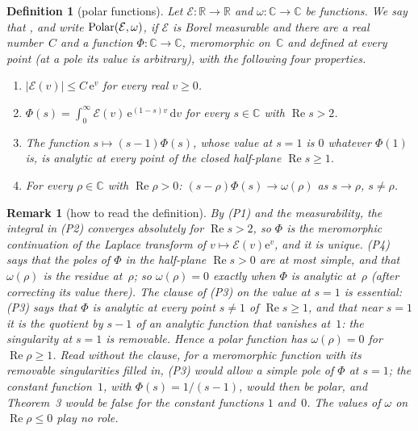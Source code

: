 \documentclass[11pt,a4paper]{article}
\makeatletter
\newcommand{\lean}[1]{\csname LN@#1\endcsname}
\newcommand{\leantag}{{\sffamily\bfseries\fontsize{6.3}{8}\selectfont\color{leancol}\addfontfeatures{LetterSpace=7}LEAN}}
\newcommand{\leanline}[1]{\par\nopagebreak\vspace{-2.5pt}{\fontsize{8.9}{12.4}\selectfont\color{inksoft}\raggedright
  \noindent\llap{\leantag\hspace{9pt}}#1\par}\vspace{1pt}}
\theoremstyle{plainx}
\theoremstyle{uprightx}
\newtheorem{definition}[theorem]{Definition}
\newtheorem{remark}[theorem]{Remark}
\newcommand{\C}{\mathbb{C}}
\newcommand{\RR}{\mathbb{R}}
\newcommand{\ee}{\mathrm{e}}
\newcommand{\dd}{\mathrm{d}}
\newcommand{\re}{\operatorname{Re}}
\newcommand{\cE}{\mathcal{E}}
\makeatother
\begin{document}
\begin{definition}[polar functions]\label{d:polar}
Let $\cE\colon\RR\to\RR$ and $\omega\colon\C\to\C$ be functions. We say that \polarWords{\cE}{\omega}, and write
$\isPolar{\cE}{\omega}$, if $\cE$ is Borel measurable and there are a real number~$C$ and a function
$\Phi\colon\C\to\C$, meromorphic on~$\C$ and defined at every point (at a pole its value is arbitrary), with the
following four properties.
\begin{enumerate}[label=(P\arabic*)]
\item $|\cE(v)|\le C\,\ee^{v}$ for every real $v\ge 0$.
\item $\Phi(s)=\int_0^\infty\cE(v)\,\ee^{(1-s)v}\,\dd v$ for every $s\in\C$ with $\re s>2$.
\item The function $s\mapsto(s-1)\Phi(s)$, whose value at $s=1$ is $0$ whatever $\Phi(1)$ is, is analytic at every
point of the closed half-plane $\re s\ge 1$.
\item For every $\rho\in\C$ with $\re\rho>0$: $(s-\rho)\Phi(s)\to\omega(\rho)$ as $s\to\rho$, $s\ne\rho$.
\end{enumerate}
\end{definition}
\leanline{\lean{IsPolar}}

\begin{remark}[how to read the definition]\label{r:polar}
By (P1) and the measurability, the integral in (P2) converges absolutely for $\re s>2$, so $\Phi$ is the meromorphic
continuation of the Laplace transform of $v\mapsto\cE(v)\ee^{v}$, and it is unique. (P4) says that the poles of $\Phi$
in the half-plane $\re s>0$ are at most simple, and that $\omega(\rho)$ is the residue at~$\rho$; so
$\omega(\rho)=0$ exactly when $\Phi$ is analytic at~$\rho$ (after correcting its value there). The clause of (P3)
on the value at $s=1$ is essential: (P3) says that $\Phi$ is analytic at
every point $s\ne 1$ of $\re s\ge1$, and that near $s=1$ it is the quotient by $s-1$ of an analytic function that
vanishes at~$1$: the singularity at $s=1$ is removable. Hence a polar function has $\omega(\rho)=0$ for $\re\rho\ge 1$.
Read without the clause, for a meromorphic function with its removable singularities filled in, (P3) would allow a
simple pole of $\Phi$ at $s=1$; the constant function~$1$, with $\Phi(s)=1/(s-1)$, would then be polar, and
Theorem~3 would be false for the constant functions $1$ and~$0$.
The values of $\omega$ on $\re\rho\le0$ play no role.
\end{remark}
\end{document}
